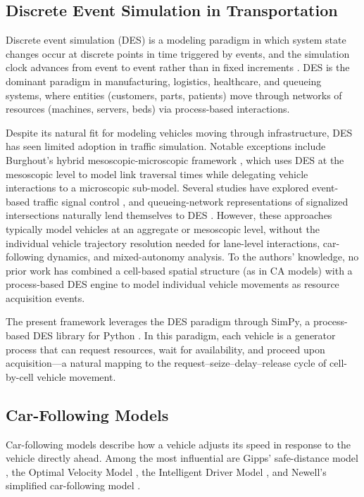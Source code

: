 \documentclass[review,authoryear]{elsarticle}
\begin{document}
\subsection{Discrete Event Simulation in Transportation}
\label{sec:lit_des}

Discrete event simulation (DES) is a modeling paradigm in which system state changes occur at discrete points in time triggered by events, and the simulation clock advances from event to event rather than in fixed increments \citep{banks2014discrete}. DES is the dominant paradigm in manufacturing, logistics, healthcare, and queueing systems, where entities (customers, parts, patients) move through networks of resources (machines, servers, beds) via process-based interactions.

Despite its natural fit for modeling vehicles moving through infrastructure, DES has seen limited adoption in traffic simulation. Notable exceptions include Burghout's hybrid mesoscopic-microscopic framework \citep{burghout2005hybrid}, which uses DES at the mesoscopic level to model link traversal times while delegating vehicle interactions to a microscopic sub-model. Several studies have explored event-based traffic signal control \citep{barcelo2005fundamentals}, and queueing-network representations of signalized intersections naturally lend themselves to DES \citep{osorio2015urban}. However, these approaches typically model vehicles at an aggregate or mesoscopic level, without the individual vehicle trajectory resolution needed for lane-level interactions, car-following dynamics, and mixed-autonomy analysis. To the authors' knowledge, no prior work has combined a cell-based spatial structure (as in CA models) with a process-based DES engine to model individual vehicle movements as resource acquisition events.

The present framework leverages the DES paradigm through SimPy, a process-based DES library for Python \citep{simpy2023}. In this paradigm, each vehicle is a generator process that can request resources, wait for availability, and proceed upon acquisition---a natural mapping to the request--seize--delay--release cycle of cell-by-cell vehicle movement.

\subsection{Car-Following Models}
\label{sec:lit_cf}

Car-following models describe how a vehicle adjusts its speed in response to the vehicle directly ahead. Among the most influential are Gipps' safe-distance model \citep{gipps1981behavioural}, the Optimal Velocity Model \citep{bando1995dynamical}, the Intelligent Driver Model \citep{treiber2000congested}, and Newell's simplified car-following model \citep{newell2002simplified}.
\end{document}
